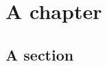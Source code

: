 \documentclass{report}
\begin{document}
\tableofcontents
\chapter{A chapter}
\section{A section}
\end{document}
